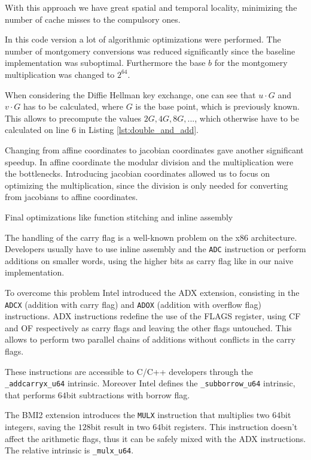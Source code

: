 With this approach we have great spatial and temporal locality, minimizing the number of cache misses to the compulsory ones.

In this code version a lot of algorithmic optimizations were performed. The number of montgomery conversions was reduced significantly since the baseline implementation was suboptimal. Furthermore the base $b$ for the montgomery multiplication was changed to $2^{64}$.

When considering the Diffie Hellman key exchange, one can see that $u \cdot G$ and $v \cdot G$ has to be calculated, where $G$ is the base point, which is previously known. This allows to precompute the values $2G, 4G, 8G,...$, which otherwise have to be calculated on line 6 in Listing \ref{lst:double_and_add}.

Changing from affine coordinates to jacobian coordinates gave another significant speedup. In affine coordinate the modular division and the multiplication were the bottlenecks. Introducing jacobian coordinates allowed us to focus on optimizing the multiplication, since the division is only needed for converting from jacobians to affine coordinates.

Final optimizations like function stitching and inline assembly 

The handling of the carry flag is a well-known problem on the x86 architecture. Developers usually have to use inline assembly and the \texttt{ADC} instruction or perform additions on smaller words, using the higher bits as carry flag like in our naive implementation.

To overcome this problem Intel introduced the ADX extension, consisting in the \texttt{ADCX} (addition with carry flag) and \texttt{ADOX} (addition with overflow flag) instructions. ADX instructions redefine the use of the FLAGS register, using CF and OF respectively as carry flags and leaving the other flags untouched. This allows to perform two parallel chains of additions without conflicts in the carry flags.

These instructions are accessible to C/C++ developers through the \texttt{\_addcarryx\_u64} intrinsic. Moreover Intel defines the \texttt{\_subborrow\_u64} intrinsic, that performs $64$bit subtractions with borrow flag.

The BMI2 extension introduces the \texttt{MULX} instruction that multiplies two $64$bit integers, saving the $128$bit result in two $64$bit registers. This instruction doesn't affect the arithmetic flags, thus it can be safely mixed with the ADX instructions. The relative intrinsic is \texttt{\_mulx\_u64}. 

